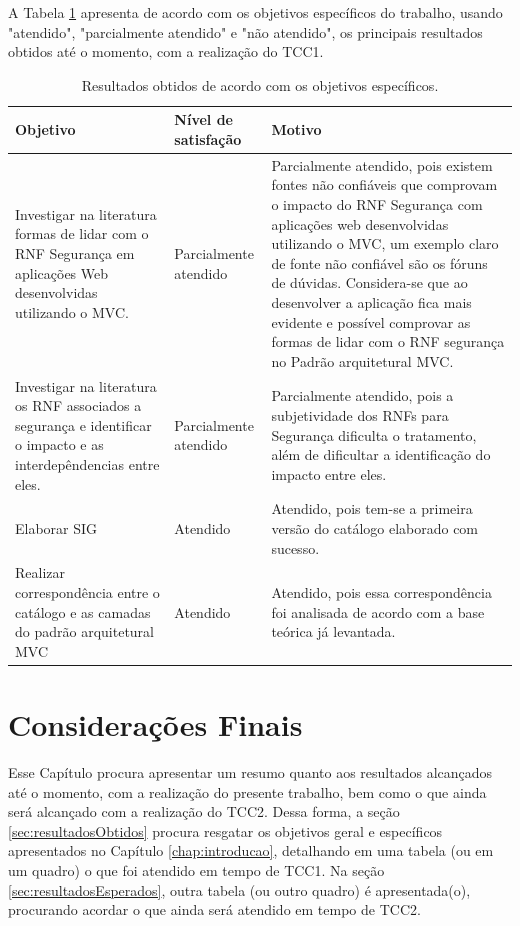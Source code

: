 A Tabela \ref{resultadosObtidos} apresenta de acordo com os objetivos específicos do trabalho, usando "atendido", "parcialmente atendido" e "não atendido", os principais resultados obtidos até o momento, com a realização do TCC1.

\begin{table}[h!]
	\centering
	\caption{Resultados obtidos de acordo com os objetivos específicos.}
	\label{resultadosObtidos}
	\tiny
	\begin{tabular}{@{}p{6cm}p{3cm}p{6cm}@{}}
		\toprule
		\textbf{Objetivo} & \textbf{Nível de satisfação} & \textbf{Motivo} \\ \midrule
		Investigar na literatura formas de lidar com o RNF Segurança  em aplicações Web desenvolvidas utilizando o MVC. & Parcialmente atendido & Parcialmente atendido, pois existem fontes não confiáveis que comprovam o impacto do RNF Segurança com aplicações web desenvolvidas utilizando o MVC, um exemplo claro de fonte não confiável são os fóruns de dúvidas. Considera-se que ao desenvolver a aplicação fica mais evidente e possível comprovar as formas de lidar com o RNF segurança no Padrão arquitetural MVC. \\
		\rowcolor[HTML]{C0C0C0} 
		Investigar na literatura os RNF associados a segurança e identificar o impacto e as interdepêndencias entre eles. & Parcialmente atendido & Parcialmente atendido, pois a subjetividade dos RNFs para Segurança dificulta o tratamento, além de dificultar a identificação do impacto entre eles. \\
		Elaborar SIG & Atendido & Atendido, pois tem-se a primeira versão do catálogo elaborado com sucesso. \\
		\rowcolor[HTML]{C0C0C0} 
		Realizar correspondência entre o catálogo e as camadas do padrão arquitetural MVC & Atendido & Atendido, pois essa correspondência foi analisada de acordo com a base teórica já levantada. \\ \bottomrule
	\end{tabular}
\end{table}

\chapter{Considerações Finais}
\label{chap:consideracoesFinais}

Esse Capítulo procura apresentar um resumo quanto aos resultados alcançados até o momento, com a realização do presente trabalho, bem como o que ainda será alcançado com a realização do TCC2. Dessa forma, a seção \ref{sec:resultadosObtidos} procura resgatar os objetivos geral e específicos apresentados no Capítulo \ref{chap:introducao}, detalhando em uma tabela (ou em um quadro) o que foi atendido em tempo de TCC1. Na seção \ref{sec:resultadosEsperados}, outra tabela (ou outro quadro) é apresentada(o), procurando acordar o que ainda será atendido em tempo de TCC2.


